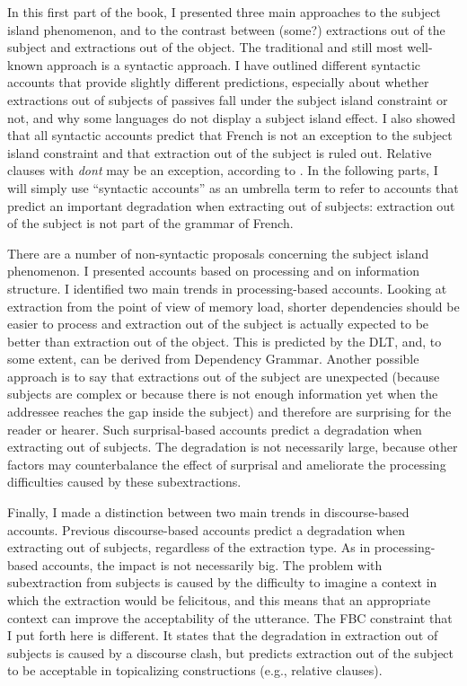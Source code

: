 In this first part of the book, I presented three main approaches to the subject island phenomenon, and to the contrast between (some?) extractions out of the subject and extractions out of the object. The traditional and still most well-known approach is a syntactic approach. I have outlined different syntactic accounts that provide slightly different predictions, especially about whether extractions out of subjects of passives fall under the subject island constraint or not, and why some languages do not display a subject island effect. I also showed that all syntactic accounts predict that French is not an exception to the subject island constraint and that extraction out of the subject is ruled out. Relative clauses with \emph{dont} may be an exception, according to \citet{Tellier.1990,Tellier.1991}. In the following parts, I will simply use ``syntactic accounts'' as an umbrella term to refer to accounts that predict an important degradation when extracting out of subjects: extraction out of the subject is not part of the grammar of French. 

There are a number of non-syntactic proposals concerning the subject island phenomenon. I presented accounts based on processing and on information structure. I identified two main trends in processing-based accounts. Looking at extraction from the point of view of memory load, shorter dependencies should be easier to process and extraction out of the subject is actually expected to be better than extraction out of the object. This is predicted by the DLT, and, to some extent, can be derived from Dependency Grammar. Another possible approach is to say that extractions out of the subject are unexpected (because subjects are complex or because there is not enough information yet when the addressee reaches the gap inside the subject) and therefore are surprising for the reader or hearer. Such surprisal-based accounts predict a degradation when extracting out of subjects. The degradation is not necessarily large, because other factors may counterbalance the effect of surprisal and ameliorate the processing difficulties caused by these subextractions.

Finally, I made a distinction between two main trends in discourse-based accounts. Previous discourse-based accounts predict a degradation when extracting out of subjects, regardless of the extraction type. As in processing-based accounts, the impact is not necessarily big. The problem with subextraction from subjects is caused by the difficulty to imagine a context in which the extraction would be felicitous, and this means that an appropriate context can improve the acceptability of the utterance. The FBC constraint that I put forth here is different. It states that the degradation in extraction out of subjects is caused by a discourse clash, but predicts extraction out of the subject to be acceptable in topicalizing constructions (e.g., relative clauses). 

